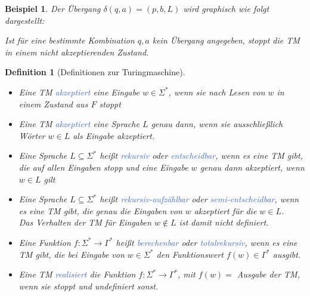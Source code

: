 \documentclass[11pt]{scrartcl}
\newcommand{\tcol}[1]{\textcolor{RoyalBlue}{#1}}
\theoremstyle{break}
\newtheorem{defi}[satz]{Definition}
\newtheorem{beis}[satz]{Beispiel}
\begin{document}
    \begin{beis}
        Der Übergang $\delta(q,a)=(p,b,L)$ wird graphisch wie folgt dargestellt:
        \begin{center}
        \end{center}
        Ist für eine bestimmte Kombination $q,a$ kein Übergang angegeben, stoppt die TM in einem nicht akzeptierenden Zustand.
    \end{beis}

    \begin{defi}[Definitionen zur Turingmaschine]
        \begin{itemize}
            \item Eine TM \tcol{akzeptiert} eine Eingabe $w\in\Sigma^*$, wenn sie nach Lesen von $w$ in einem Zustand aus $F$ stoppt
            \item Eine TM \tcol{akzeptiert} eine Sprache $L$ genau dann, wenn sie ausschließlich Wörter $w\in L$ als Eingabe akzeptiert.
            \item Eine Sprache $L\subseteq\Sigma^*$ heißt \tcol{rekursiv} oder \tcol{entscheidbar}, wenn es eine TM gibt, die auf allen Eingaben stopp und eine Eingabe $w$ genau dann akzeptiert, wenn $w\in L$ gilt
            \item Eine Sprache $L\subseteq\Sigma^*$ heißt \tcol{rekursiv-aufzählbar} oder \tcol{semi-entscheidbar}, wenn es eine TM gibt, die genau die Eingaben von $w$ akzeptiert für die $w\in L$.\\
            Das Verhalten der TM für Eingaben $w\notin L$ ist damit nicht definiert.
            \item Eine Funktion $f\colon\Sigma^*\to\Gamma^*$ heißt \tcol{berechenbar} oder \tcol{totalrekursiv}, wenn es eine TM gibt, die bei Eingabe von $w\in\Sigma^*$ den Funktionswert $f(w)\in\Gamma^*$ ausgibt.
            \item Eine TM \tcol{realisiert} die Funktion $f\colon\Sigma^*\to\Gamma^*$, mit $f(w)=$ Ausgabe der TM, wenn sie stoppt und undefiniert sonst.
        \end{itemize}
    \end{defi}
\end{document}

